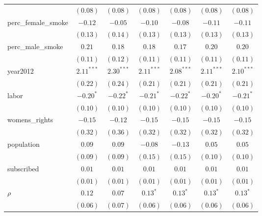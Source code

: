 \begin{table}[!h]
\begin{center}
\begin{tabular}{l c c c c c c }
                        & $(0.08)$     & $(0.08)$     & $(0.08)$     & $(0.08)$     & $(0.08)$     & $(0.08)$     \\
perc\_female\_smoke     & $-0.12$      & $-0.05$      & $-0.10$      & $-0.08$      & $-0.11$      & $-0.11$      \\
                        & $(0.13)$     & $(0.14)$     & $(0.13)$     & $(0.13)$     & $(0.13)$     & $(0.13)$     \\
perc\_male\_smoke       & $0.21$       & $0.18$       & $0.18$       & $0.17$       & $0.20$       & $0.20$       \\
                        & $(0.11)$     & $(0.12)$     & $(0.11)$     & $(0.11)$     & $(0.11)$     & $(0.11)$     \\
year2012                & $2.11^{***}$ & $2.30^{***}$ & $2.11^{***}$ & $2.08^{***}$ & $2.11^{***}$ & $2.10^{***}$ \\
                        & $(0.22)$     & $(0.24)$     & $(0.21)$     & $(0.21)$     & $(0.21)$     & $(0.21)$     \\
labor                   & $-0.20^{*}$  & $-0.22^{*}$  & $-0.21^{*}$  & $-0.22^{*}$  & $-0.20^{*}$  & $-0.21^{*}$  \\
                        & $(0.10)$     & $(0.10)$     & $(0.10)$     & $(0.10)$     & $(0.10)$     & $(0.10)$     \\
womens\_rights          & $-0.15$      & $-0.12$      & $-0.15$      & $-0.15$      & $-0.15$      & $-0.15$      \\
                        & $(0.32)$     & $(0.36)$     & $(0.32)$     & $(0.32)$     & $(0.32)$     & $(0.32)$     \\
population              & $0.09$       & $0.09$       & $-0.08$      & $-0.13$      & $0.05$       & $0.05$       \\
                        & $(0.09)$     & $(0.09)$     & $(0.15)$     & $(0.15)$     & $(0.10)$     & $(0.10)$     \\
subscribed              & $0.01$       & $0.01$       & $0.01$       & $0.01$       & $0.01$       & $0.01$       \\
                        & $(0.01)$     & $(0.01)$     & $(0.01)$     & $(0.01)$     & $(0.01)$     & $(0.01)$     \\
$\rho$                  & $0.12$       & $0.07$       & $0.13^{*}$   & $0.13^{*}$   & $0.13^{*}$   & $0.13^{*}$   \\
                        & $(0.06)$     & $(0.07)$     & $(0.06)$     & $(0.06)$     & $(0.06)$     & $(0.06)$     \\

\end{tabular}
\end{center}
\end{table}
